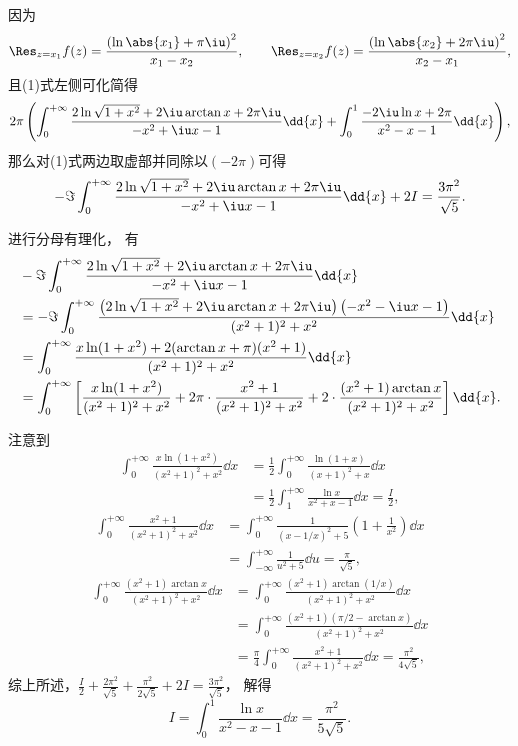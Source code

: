 \begin{example}
\begin{solution}
因为\begin{equation*}
	\Res_{z=x_1} f(z)
	= \frac{\left(\ln\abs{x_1} + \pi\iu\right)^2}{x_1 - x_2},
	\qquad
	\Res_{z=x_2} f(z)
	= \frac{\left(\ln\abs{x_2} + 2\pi\iu\right)^2}{x_2 - x_1},
\end{equation*}
且(1)式左侧可化简得\begin{align*}
	2\pi \left(
		\int_0^{+\infty} \frac{2\ln\sqrt{1+x^2} + 2\iu \arctan x + 2\pi\iu}{-x^2+\iu x-1} \dd{x}
		+ \int_0^1 \frac{-2\iu \ln x + 2\pi}{x^2-x-1} \dd{x}
	\right),
\end{align*}
那么对(1)式两边取虚部并同除以\((-2\pi)\)可得\begin{equation*}
	-\Im \int_0^{+\infty} \frac{2\ln\sqrt{1+x^2} + 2\iu \arctan x + 2\pi\iu}{-x^2+\iu x-1} \dd{x}
	+ 2I = \frac{3\pi^2}{\sqrt{5}}.
\end{equation*}

进行分母有理化，
有\begin{align*}
	&-\Im \int_0^{+\infty} \frac{2\ln\sqrt{1+x^2} + 2\iu \arctan x + 2\pi\iu}{-x^2+\iu x-1} \dd{x} \\
	&= -\Im \int_0^{+\infty} \frac{\left(2\ln\sqrt{1+x^2} + 2\iu \arctan x + 2\pi\iu\right) \left(-x^2-\iu x-1\right)}{(x^2+1)^2+x^2} \dd{x} \\
	&= \int_0^{+\infty} \frac{x \ln(1+x^2) + 2(\arctan x + \pi) (x^2+1)}{(x^2+1)^2+x^2} \dd{x} \\
	&= \int_0^{+\infty} \left[
	\frac{x \ln(1+x^2)}{(x^2+1)^2+x^2}
	+ 2\pi \cdot \frac{x^2+1}{(x^2+1)^2+x^2}
	+ 2 \cdot \frac{(x^2+1) \arctan x}{(x^2+1)^2+x^2}
	\right] \dd{x}.
\end{align*}

注意到\begin{align*}
	\int_0^{+\infty} \frac{x \ln(1+x^2)}{(x^2+1)^2+x^2} \dd{x}
	&= \frac{1}{2} \int_0^{+\infty} \frac{\ln(1+x)}{(x+1)^2+x} \dd{x} \\
	&= \frac{1}{2} \int_1^{+\infty} \frac{\ln x}{x^2+x-1} \dd{x}
	= \frac{I}{2},
\end{align*}
\begin{align*}
	\int_0^{+\infty} \frac{x^2+1}{(x^2+1)^2+x^2} \dd{x}
	&= \int_0^{+\infty} \frac{1}{\left(x-1/x\right)^2+5} \left(1+\frac{1}{x^2}\right) \dd{x} \\
	&= \int_{-\infty}^{+\infty} \frac{1}{u^2+5} \dd{u}
	= \frac{\pi}{\sqrt{5}},
\end{align*}
\begin{align*}
	\int_0^{+\infty} \frac{(x^2+1) \arctan x}{(x^2+1)^2+x^2} \dd{x}
	&= \int_0^{+\infty} \frac{(x^2+1) \arctan(1/x)}{(x^2+1)^2+x^2} \dd{x} \\
	&= \int_0^{+\infty} \frac{(x^2+1) (\pi/2 - \arctan x)}{(x^2+1)^2+x^2} \dd{x} \\
	&= \frac{\pi}{4} \int_0^{+\infty} \frac{x^2+1}{(x^2+1)^2+x^2} \dd{x}
	= \frac{\pi^2}{4\sqrt{5}},
\end{align*}
综上所述，\(\frac{I}{2} + \frac{2\pi^2}{\sqrt{5}} + \frac{\pi^2}{2\sqrt{5}} + 2I
= \frac{3\pi^2}{\sqrt{5}}\)，
解得\begin{equation*}
	I = \int_0^1 \frac{\ln x}{x^2-x-1} \dd{x}
	= \frac{\pi^2}{5\sqrt{5}}.
\end{equation*}
\end{solution}
\end{example}
